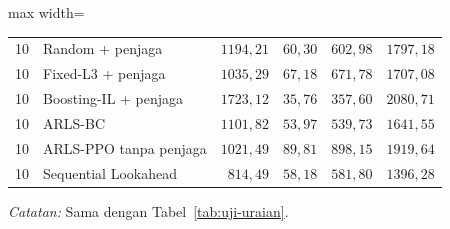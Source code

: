 \begin{table}[htbp]
\begin{adjustbox}{max width=\textwidth}
\begin{tabular}{llrrrr}
10 & Random + penjaga & $1194{,}21$ & $60{,}30$ & $602{,}98$ & $1797{,}18$ \\
10 & Fixed-L3 + penjaga & $1035{,}29$ & $67{,}18$ & $671{,}78$ & $1707{,}08$ \\
10 & Boosting-IL + penjaga & $1723{,}12$ & $35{,}76$ & $357{,}60$ & $2080{,}71$ \\
10 & ARLS-BC & $1101{,}82$ & $53{,}97$ & $539{,}73$ & $1641{,}55$ \\
10 & ARLS-PPO tanpa penjaga & $1021{,}49$ & $89{,}81$ & $898{,}15$ & $1919{,}64$ \\
10 & Sequential Lookahead & $814{,}49$ & $58{,}18$ & $581{,}80$ & $1396{,}28$ \\
\bottomrule
\end{tabular}
\end{adjustbox}
\par\smallskip\footnotesize\textit{Catatan:} Sama dengan Tabel~\ref{tab:uji-uraian}.
\end{table}
